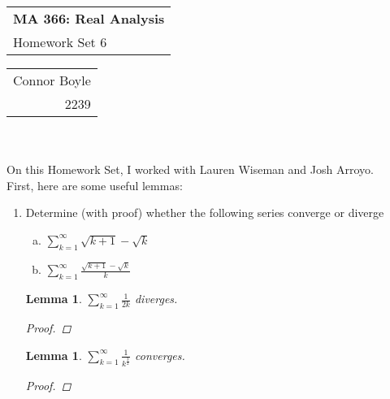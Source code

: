 \documentclass{amsart}
\def\name{Connor Boyle} %
\def\CM{2239} %
\def\hwnum{6} %
\newtheorem{lemma}[theorem]{Lemma}
\begin{document}
\noindent
\thispagestyle{firststyle}
\begin{tabular}{l}
{\LARGE \textbf{MA 366: Real Analysis} }\\
{\Large Homework Set \hwnum}
\end{tabular} \hfill \begin{tabular}{r}
                        \name \\
                        \CM
                        \end{tabular}

\noindent \hrulefill \\\\
On this Homework Set, I worked with Lauren Wiseman and Josh Arroyo.\\
First, here are some useful lemmas:

\newpage
\begin{enumerate}[1.]
\item Determine (with proof) whether the following series converge or diverge
\begin{enumerate}[(a)]
\item $\displaystyle \sum_{k=1}^\infty \sqrt{k+1}-\sqrt{k}$
\item $\displaystyle \sum_{k=1}^\infty \frac{\sqrt{k+1}-\sqrt{k}}{k}$
\end{enumerate}
\begin{lemma}
    $\displaystyle \sum_{k=1}^\infty \frac{1}{2k}$ diverges.
    \begin{proof}
    \end{proof}
\end{lemma}
\begin{lemma}
    $\displaystyle \sum_{k=1}^\infty \frac{1}{k^{\frac{3}{2}}}$ converges.
    \begin{proof}
    \end{proof}
\end{lemma}


\end{enumerate}
\end{document}
